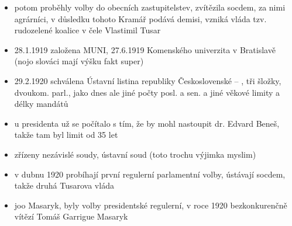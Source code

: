 \documentclass{article}
\begin{document}
\begin{itemize}
  \item potom proběhly volby do obecních zastupitelstev, zvítězila socdem, za nimi agrárníci, v důsledku tohoto Kramář podává demisi, vzniká vláda tzv. rudozelené koalice v čele Vlastimil Tusar
  \item 28.1.1919 založena MUNI, 27.6.1919 Komenského univerzita v Bratislavě (nojo slováci mají výšku fakt super)
  \item 29.2.1920 schválena Ústavní listina republiky Československé -- , tři šložky, dvoukom. parl., jako dnes ale jiné počty posl. a sen. a jiné věkové limity a délky mandátů
  \item u presidenta už se počítalo s tím, že by mohl nastoupit dr. Edvard Beneš, takže tam byl limit od 35 let
  \item zřízeny nezávislé soudy, ústavní soud (toto trochu výjimka myslim)
  \item v dubnu 1920 probíhají první regulerní parlamentní volby, ústávají socdem, takže druhá Tusarova vláda
  \item joo Masaryk, byly volby presidentské regulerní, v roce 1920 bezkonkurenčně vítězí Tomáš Garrigue Masaryk
\end{itemize}
\end{document}

